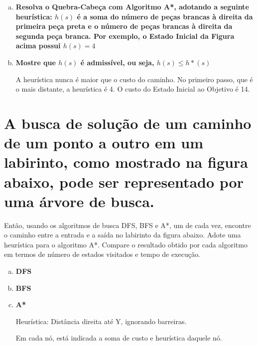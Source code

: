 \documentclass[paper=a4, fontsize=11pt]{scrartcl} %
\begin{document}
    \begin{enumerate}[(a)]
        \pagebreak
        \item \textbf{Resolva o Quebra-Cabeça com Algoritmo A*, adotando a seguinte heurística: $h(s)$ é a soma do número de peças brancas à direita da primeira peça preta e o número de peças brancas à direita da segunda peça branca. Por exemplo, o Estado Inicial da Figura acima possui $h(s) = 4$}
        \par 
        \vspace{0.2cm}

        \item \textbf{Mostre que $h(s)$ é admissível, ou seja, $h(s) \leq h*(s)$}
        \par A heurística nunca é maior que o custo do caminho. No primeiro passo, que é o mais distante, a heurística é 4. O custo do Estado Inicial ao Objetivo é 14.
        \vspace{0.2cm}

    \end{enumerate}

    
    \section{A busca de solução de um caminho de um ponto a outro em um labirinto, como mostrado na figura abaixo, pode ser representado por uma árvore de busca.}
    
    \par Então, usando os algoritmos de busca DFS, BFS e A*, um de cada vez, encontre o caminho entre a entrada e a saída no labirinto da figura abaixo. Adote uma heurística para o algoritmo A*. Compare o resultado obtido por cada algoritmo em termos de número de estados visitados e tempo de execução.

    \begin{enumerate}[(a)]
        \item \textbf{DFS}
        \par 
        \vspace{0.2cm}
        \pagebreak
        \item \textbf{BFS}
        \par 
        \vspace{0.2cm}
        \pagebreak
        \item \textbf{A*}
        \par Heurística: Distância direita até Y, ignorando barreiras.
        \par Em cada nó, está indicada a soma de custo e heurística daquele nó.
        \par 
        \vspace{0.2cm}

    \end{enumerate}


    
\end{document}

